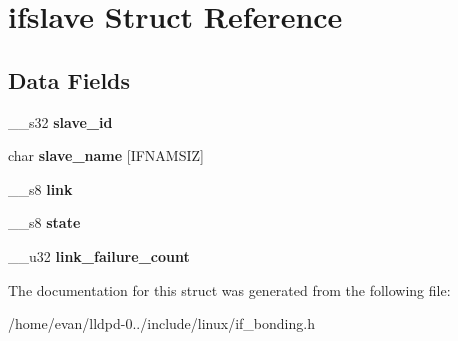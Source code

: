\section{ifslave \-Struct \-Reference}
\label{structifslave}
\subsection*{\-Data \-Fields}
\begin{DoxyCompactItemize}
\item 
\-\_\-\-\_\-s32 {\bfseries slave\-\_\-id}\label{structifslave_a9a54fb4b7bfd0f55450623209c10aa86}

\item 
char {\bfseries slave\-\_\-name} [\-I\-F\-N\-A\-M\-S\-I\-Z]\label{structifslave_a96935233ad7938d54daf4d6bd58f6d5e}

\item 
\-\_\-\-\_\-s8 {\bfseries link}\label{structifslave_a0c409ab254fb304963ba5356888a7a6f}

\item 
\-\_\-\-\_\-s8 {\bfseries state}\label{structifslave_a46d6263e6c41a842db7137f2d689f6ed}

\item 
\-\_\-\-\_\-u32 {\bfseries link\-\_\-failure\-\_\-count}\label{structifslave_acb690e32f5764a97ec6da52f3010a0a1}

\end{DoxyCompactItemize}


\-The documentation for this struct was generated from the following file\-:\begin{DoxyCompactItemize}
\item 
/home/evan/lldpd-\/0../include/linux/if\-\_\-bonding.\-h\end{DoxyCompactItemize}
